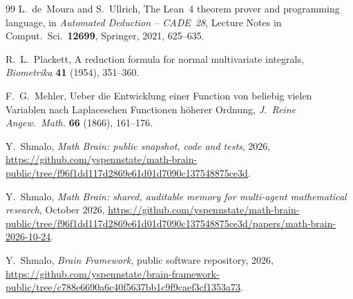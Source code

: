 \documentclass[11pt]{article}
\theoremstyle{remark}
\begin{document}
\begin{thebibliography}{99}
L.~de~Moura and S.~Ullrich,
The Lean~4 theorem prover and programming language,
in \emph{Automated Deduction -- CADE~28}, Lecture Notes in Comput.~Sci.\
\textbf{12699}, Springer, 2021, 625--635.

R.~L.~Plackett,
A reduction formula for normal multivariate integrals,
\emph{Biometrika} \textbf{41} (1954), 351--360.

F.~G.~Mehler,
Ueber die Entwicklung einer Function von beliebig vielen Variablen nach
Laplaceschen Functionen h\"oherer Ordnung,
\emph{J.~Reine Angew.~Math.} \textbf{66} (1866), 161--176.

 Y.~Shmalo, \emph{Math Brain: public snapshot, code and tests}, 2026, \url{https://github.com/yspennstate/math-brain-public/tree/f96f1dd117d2869e61d01d7090c137548875ce3d}.

 Y.~Shmalo, \emph{Math Brain: shared, auditable memory for multi-agent mathematical research}, October 2026, \url{https://github.com/yspennstate/math-brain-public/tree/f96f1dd117d2869e61d01d7090c137548875ce3d/papers/math-brain-2026-10-24}.

 Y.~Shmalo, \emph{Brain Framework}, public software repository, 2026, \url{https://github.com/yspennstate/brain-framework-public/tree/c788e6690a6c40f5637bb1c9f9caef3cf1353a73}.

\end{thebibliography}
\end{document}
